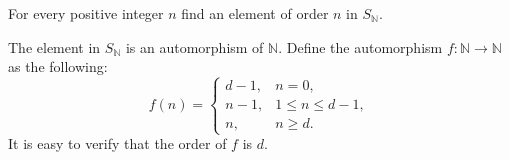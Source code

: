 \begin{problem}[2.3]
        For every positive integer $n$ find an element of order $n$ in $S_\mathbb{N}$.
\end{problem}
\begin{solution}
The element in $S_\mathbb{N}$ is an automorphism of $\mathbb{N}$. Define the automorphism $f:\mathbb{N}\to \mathbb{N}$ as the following:
\[
f(n)=
\begin{cases}
d-1, &n=0,\\
n-1, &1\leq n \leq d-1,\\
n, &n \geq d.
\end{cases}
\]
It is easy to verify that the order of $f$ is $d$.
\end{solution}
